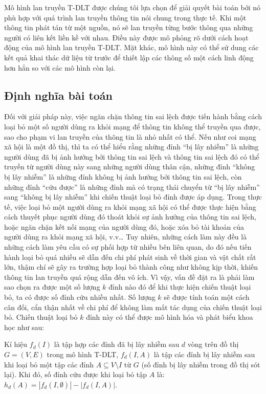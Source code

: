 Mô hình lan truyền T-DLT được chúng tôi lựa chọn để giải quyết bài toán bởi nó phù hợp với quá trình lan truyền thông tin nói chung trong thực tế. Khi một thông tin phát tán từ một nguồn, nó sẽ lan truyền từng bước thông qua những người có liên kết liền kề với nhau. Điều này được mô phỏng rõ dưới cách hoạt động của mô hình lan truyền T-DLT. Mặt khác, mô hình này có thể sử dung các kết quả khai thác dữ liệu từ trước để thiết lập các thông số một cách linh động hơn hẳn so với các mô hình còn lại.

\subsection{Định nghĩa bài toán}
Đối với giải pháp này, việc ngăn chặn thông tin sai lệch được tiến hành bằng cách loại bỏ một số người dùng ra khỏi mạng để thông tin không thể truyền qua được, sao cho phạm vi lan truyền của thông tin là nhỏ nhất có thể. Nếu như coi mạng xã hội là một đồ thị, thì ta có thể hiểu rằng những đỉnh “bị lây nhiễm” là những người dùng đã bị ảnh hưởng bởi thông tin sai lệch và thông tin sai lệch đó có thể truyền từ người dùng này sang những người dùng thân cận, những đỉnh “không bị lây nhiễm” là những đỉnh không bị ảnh hưởng bởi thông tin sai lệch, còn những đỉnh “cứu được” là những đỉnh mà có trạng thái chuyển từ “bị lây nhiễm” sang “không bị lây nhiễm” khi chiến thuật loại bỏ đỉnh được áp dụng. Trong thực tế, việc loại bỏ một người dùng ra khỏi mạng xã hội có thể được thực hiện bằng cách thuyết phục người dùng đó thoát khỏi sự ảnh hưởng của thông tin sai lệch, hoặc ngăn chặn kết nối mạng của người dùng đó, hoặc xóa bỏ tài khoản của người dùng ra khỏi mạng xã hội, v.v… Tuy nhiên, những cách làm này đều là những cách làm yêu cầu có sự phối hợp từ nhiều bên liên quan, do đó nếu tiến hành loại bỏ quá nhiều sẽ dẫn đến chi phí phát sinh về thời gian và vật chất rất lớn, thậm chí sẽ gây ra trường hợp loại bỏ thành công như không kịp thời, khiến thông tin lan truyền quá rộng dẫn đến vô ích. Vì vậy, vấn đề đặt ra là phải làm sao chọn ra được một số lượng $k$ đỉnh nào đó để khi thực hiện chiến thuật loại bỏ, ta có được số đỉnh cứu nhiều nhất. Số lượng $k$ sẽ được tính toán một cách cân đối, cẩn thận nhất về chi phí để không làm mất tác dụng của chiến thuật loại bỏ. Chiến thuật loại bỏ $k$ đỉnh này có thể được mô hình hóa và phát biểu khoa học như sau:  

Kí hiệu $f_{d}(I)$ là tập hợp các đỉnh đã bị lây nhiễm sau $d$ vòng trên đồ thị $G = (V,E)$ trong mô hình T-DLT, $f_{d}(I,A)$ là tập các đỉnh bị lây nhiễm sau khi loại bỏ một tập các đỉnh $A \subseteq V \setminus I$ từ $G$ (số đỉnh bị lây nhiễm trong đồ thị sót lại). Khi đó, số đỉnh cứu được khi loại bỏ tập $A$ là: $h_{d}(A)=| f_{d}(I,\emptyset)|-|f_{d}(I,A)|$.

